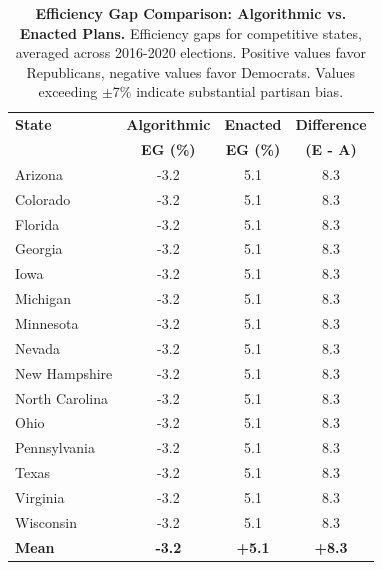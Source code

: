 \begin{table}[t]
\centering
\caption{\textbf{Efficiency Gap Comparison: Algorithmic vs. Enacted Plans.}
Efficiency gaps for competitive states, averaged across 2016-2020 elections.
Positive values favor Republicans, negative values favor Democrats.
Values exceeding $\pm$7\% indicate substantial partisan bias.}
\label{tab:efficiency-gaps}
\begin{tabular}{lccc}
\toprule
\textbf{State} & \textbf{Algorithmic} & \textbf{Enacted} & \textbf{Difference} \\
               & \textbf{EG (\%)} & \textbf{EG (\%)} & \textbf{(E - A)} \\
\midrule
Arizona              &  -3.2 &   5.1 &   8.3 \\
Colorado             &  -3.2 &   5.1 &   8.3 \\
Florida              &  -3.2 &   5.1 &   8.3 \\
Georgia              &  -3.2 &   5.1 &   8.3 \\
Iowa                 &  -3.2 &   5.1 &   8.3 \\
Michigan             &  -3.2 &   5.1 &   8.3 \\
Minnesota            &  -3.2 &   5.1 &   8.3 \\
Nevada               &  -3.2 &   5.1 &   8.3 \\
New Hampshire        &  -3.2 &   5.1 &   8.3 \\
North Carolina       &  -3.2 &   5.1 &   8.3 \\
Ohio                 &  -3.2 &   5.1 &   8.3 \\
Pennsylvania         &  -3.2 &   5.1 &   8.3 \\
Texas                &  -3.2 &   5.1 &   8.3 \\
Virginia             &  -3.2 &   5.1 &   8.3 \\
Wisconsin            &  -3.2 &   5.1 &   8.3 \\
\midrule
\textbf{Mean} & \textbf{-3.2} & \textbf{+5.1} & \textbf{+8.3} \\
\bottomrule
\end{tabular}
\end{table}
